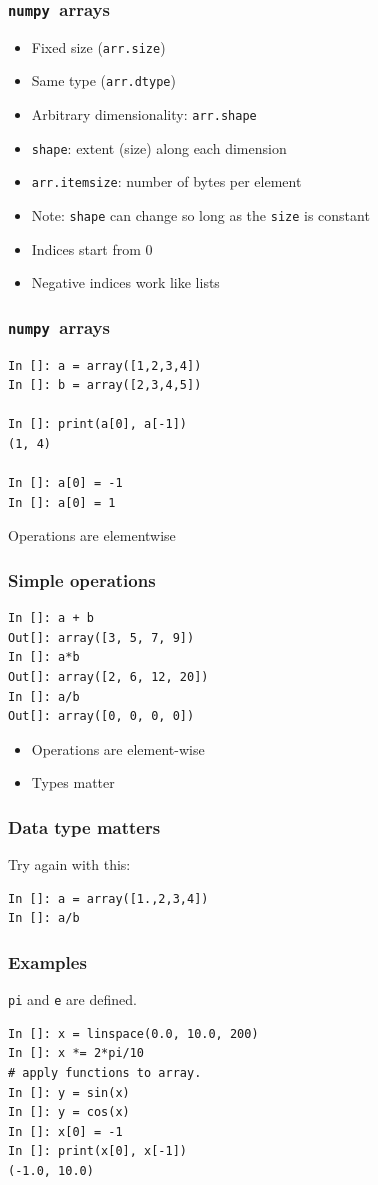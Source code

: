 \documentclass[14pt,compress]{beamer}
\newcounter{time}
\newcommand{\inctime}[1]{\addtocounter{time}{#1}{\tiny \thetime\ m}}
\newcommand{\typ}[1]{\lstinline{#1}}
\newcommand{\num}{\texttt{numpy}}
\begin{document}
\begin{frame}
  \frametitle{\num\ arrays}
  \begin{itemize}
  \item Fixed size (\typ{arr.size})
  \item Same type (\typ{arr.dtype})
  \item Arbitrary dimensionality: \typ{arr.shape}
  \item \typ{shape}: extent (size) along each dimension
  \item \typ{arr.itemsize}: number of bytes per element
  \item \alert{Note:} \typ{shape} can change so long as the \typ{size}
      is constant
  \item Indices start from 0
  \item Negative indices work like lists
  \end{itemize}
\end{frame}

\begin{frame}[fragile]
  \frametitle{\num\ arrays}
\begin{lstlisting}
In []: a = array([1,2,3,4])
In []: b = array([2,3,4,5])

In []: print(a[0], a[-1])
(1, 4)

In []: a[0] = -1
In []: a[0] = 1
\end{lstlisting}
Operations are elementwise
\end{frame}

\begin{frame}[fragile]
  \frametitle{Simple operations}
\begin{lstlisting}
In []: a + b
Out[]: array([3, 5, 7, 9])
In []: a*b
Out[]: array([2, 6, 12, 20])
In []: a/b
Out[]: array([0, 0, 0, 0])
\end{lstlisting}
  \begin{itemize}
  \item Operations are \alert{element-wise}
  \item Types matter
  \end{itemize}
  \inctime{10}
\end{frame}

\begin{frame}[fragile]
  \frametitle{Data type matters}
  Try again with this:
\begin{lstlisting}
In []: a = array([1.,2,3,4])
In []: a/b
\end{lstlisting}
\end{frame}

\begin{frame}[fragile]
  \frametitle{Examples}
\noindent \typ{pi} and \typ{e} are defined.
\begin{lstlisting}
In []: x = linspace(0.0, 10.0, 200)
In []: x *= 2*pi/10
# apply functions to array.
In []: y = sin(x)
In []: y = cos(x)
In []: x[0] = -1
In []: print(x[0], x[-1])
(-1.0, 10.0)
\end{lstlisting}
\end{frame}
\end{document}
